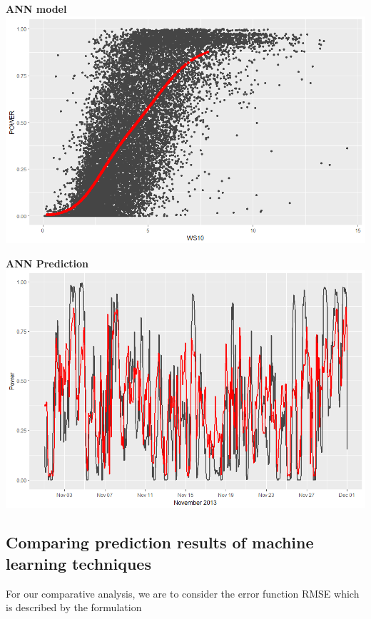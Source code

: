 \documentclass[
11pt, %
english, %
singlespacing, %
parskip, %
headsepline, %
]{report} %
\begin{document}
	\begin{center}
	    \textbf{ANN model}\\
    	\includegraphics[scale=0.3, width=\textwidth]{figures/Rplot_ANN_model_data.png}\\[1cm]    
	\end{center}
	
\newpage
	
	\begin{center}
	    \textbf{ANN Prediction}\\
    	\includegraphics[scale=0.3, width=\textwidth]{figures/Rplot_ANN.png}\\[1cm]    
	\end{center}
	
	\subsection{Comparing prediction results of machine learning techniques}
	    For our comparative analysis, we are to consider the error function RMSE which is described by the formulation
	    
\end{document}
